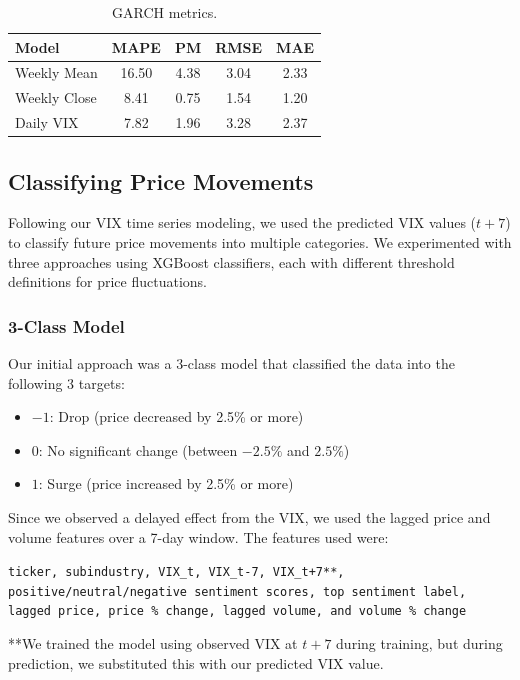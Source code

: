 \documentclass[twocolumn]{article}
\begin{document}
\begin{table}[h!]
\centering
\small
\begin{tabular}{|l|c|c|c|c|}
\hline
\textbf{Model} & \textbf{MAPE} & \textbf{PM} & \textbf{RMSE} & \textbf{MAE} \\
\hline
Weekly Mean & 16.50 & 4.38 & 3.04 & 2.33 \\
Weekly Close & 8.41 & 0.75 & 1.54 & 1.20 \\
Daily VIX & 7.82 & 1.96 & 3.28 & 2.37 \\
\hline
\end{tabular}
\caption{GARCH metrics.}
\label{tab:garch-metrics}
\end{table}

\subsection{Classifying Price Movements}

Following our VIX time series modeling, we used the predicted VIX values ($t+7$) to classify future price movements into multiple categories. We experimented with three approaches using XGBoost classifiers, each with different threshold definitions for price fluctuations.

\subsubsection*{3-Class Model}

Our initial approach was a 3-class model that classified the data into the following 3 targets:
\begin{itemize}
    \item $-1$: Drop (price decreased by 2.5\% or more)
    \item $0$: No significant change (between $-2.5\%$ and $2.5\%$)
    \item $1$: Surge (price increased by 2.5\% or more)
\end{itemize}

Since we observed a delayed effect from the VIX, we used the lagged price and volume features over a 7-day window. The features used were:

\texttt{ticker, subindustry, VIX\_t, VIX\_t-7, VIX\_t+7**, positive/neutral/negative sentiment scores, top sentiment label, lagged price, price \% change, lagged volume, and volume \% change}

**We trained the model using observed VIX at $t+7$ during training, but during prediction, we substituted this with our predicted VIX value. 
\end{document}
